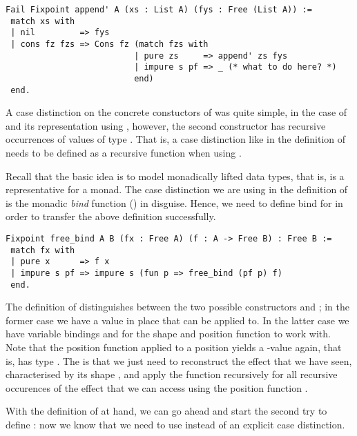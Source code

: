 \begin{verbatim}
Fail Fixpoint append' A (xs : List A) (fys : Free (List A)) :=
 match xs with
 | nil         => fys
 | cons fz fzs => Cons fz (match fzs with
                          | pure zs     => append' zs fys
                          | impure s pf => _ (* what to do here? *)
                          end)
 end.
\end{verbatim}

A case distinction on the concrete constuctors of  was quite simple, in the case of  and its representation using , however, the second constructor  has recursive occurrences of values of type .
That is, a case distinction like in the definition of  needs to be defined as a recursive function when using .

Recall that the basic idea is to model monadically lifted data types, that is,  is a representative for a monad.
The case distinction we are using in the definition of  is the monadic \emph{bind} function (\cinl{(>>=)}) in disguise.
Hence, we need to define bind for  in order to transfer the above definition successfully.

\begin{verbatim}
Fixpoint free_bind A B (fx : Free A) (f : A -> Free B) : Free B :=
 match fx with
 | pure x      => f x
 | impure s pf => impure s (fun p => free_bind (pf p) f)
 end.
\end{verbatim}

The definition of  distinguishes between the two possible constructors  and ; in the former case we have a value  in place that  can be applied to.
In the latter case we have variable bindings  and  for the shape and position function to work with.
Note that the position function applied to a position yields a -value again, that is,  has type
.
The is that we just need to reconstruct the effect that we have seen, characterised by its shape , and apply the function  recursively for all recursive occurences of the effect that we can access using the position function .

With the definition of  at hand, we can go ahead and start the second try to define : now we know that we need to use  instead of an explicit case distinction.

